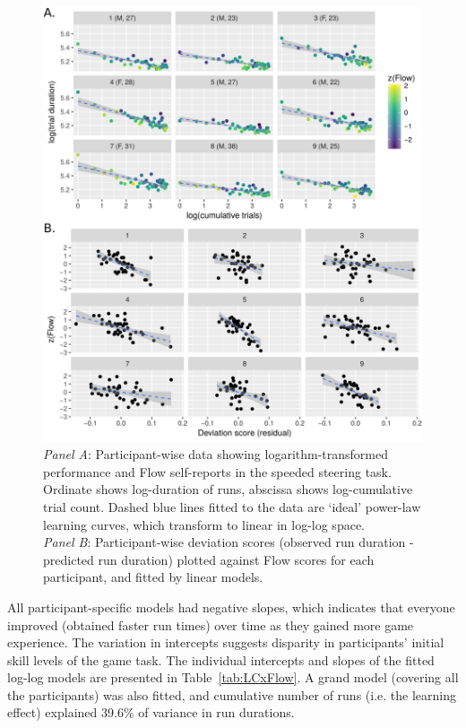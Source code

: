 \documentclass[fleqn,10pt]{wlscirep}
\begin{document}
\begin{figure}[!p]
	\centering
	\includegraphics[width=\linewidth]{cogcar_main}
	\caption{{\it Panel A}: Participant-wise data showing logarithm-transformed performance and Flow self-reports in the speeded steering task. Ordinate shows log-duration of runs, abscissa shows log-cumulative trial count. Dashed blue lines fitted to the data are `ideal' power-law learning curves, which transform to linear in log-log space.\\
  {\it Panel B}: Participant-wise deviation scores (observed run duration - predicted run duration) plotted against Flow scores for each participant, and fitted by linear models.}
	\label{fig:flowVperf}
\end{figure}

All participant-specific models had negative slopes, which indicates that everyone improved (obtained faster run times) over time as they gained more game experience. The variation in intercepts suggests disparity in participants’ initial skill levels of the game task. The individual intercepts and slopes of the fitted log-log models are presented in Table~\ref{tab:LCxFlow}. A grand model (covering all the participants) was also fitted, and cumulative number of runs (i.e. the learning effect) explained 39.6\% of variance in run durations.
\end{document}
